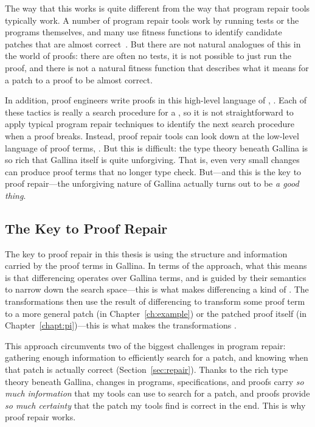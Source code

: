 
The way that this works is quite different from the way that program repair tools typically work.
A number of program repair tools work by running tests or the programs themselves,
and many use fitness functions to identify candidate patches that 
are almost correct~\cite{Monperrus:2018:ASR:3177787.3105906}. %
But there are not natural analogues of this in the world of proofs:
there are often no tests, it is not possible to just run the proof, and there is not a natural 
fitness function that describes what it means for a patch to a proof to be almost correct.

In addition, proof engineers write proofs in this high-level language of , .
Each of these tactics is really a search procedure for a , so it is not straightforward to apply
typical program repair techniques to identify the next search procedure when a proof breaks.
Instead, proof repair tools can look down at the low-level language of proof terms, .
But this is difficult: the type theory beneath Gallina is so rich that Gallina itself is quite unforgiving.
That is, even very small changes can produce proof terms that no longer type check.
But---and this is the key to proof repair---the unforgiving nature of Gallina actually turns out to be \textit{a good thing}.

\subsection{The Key to Proof Repair}
\label{sec:infocert}

The key to proof repair in this thesis is using the structure and information carried by the proof terms in Gallina.
In terms of the approach, what this means is that differencing operates over Gallina terms,
and is guided by their semantics to narrow down the search space---this is what
makes differencing a kind of .
The transformations then use the result of differencing to transform some proof term to a more general patch (in Chapter~\ref{ch:example})
or the patched proof itself (in Chapter~\ref{chapt:pi})---this is what
makes the transformations .

This approach circumvents two of the biggest challenges in program repair:
gathering enough information to efficiently search for a patch,
and knowing when that patch is actually correct (Section~\ref{sec:repair}).
Thanks to the rich type theory beneath Gallina, changes in programs, specifications, and proofs
carry \textit{so much information} that my tools can use to search for a patch,
and proofs provide \textit{so much certainty} that the patch my tools find is correct in the end.
This is why proof repair works.

